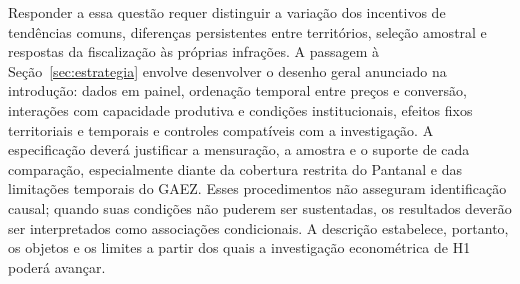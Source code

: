 Responder a essa questão requer distinguir a variação dos incentivos de tendências comuns, diferenças persistentes entre territórios, seleção amostral e respostas da fiscalização às próprias infrações. A passagem à Seção~\ref{sec:estrategia} envolve desenvolver o desenho geral anunciado na introdução: dados em painel, ordenação temporal entre preços e conversão, interações com capacidade produtiva e condições institucionais, efeitos fixos territoriais e temporais e controles compatíveis com a investigação. A especificação deverá justificar a mensuração, a amostra e o suporte de cada comparação, especialmente diante da cobertura restrita do Pantanal e das limitações temporais do GAEZ. Esses procedimentos não asseguram identificação causal; quando suas condições não puderem ser sustentadas, os resultados deverão ser interpretados como associações condicionais. A descrição estabelece, portanto, os objetos e os limites a partir dos quais a investigação econométrica de H1 poderá avançar.

\endgroup

